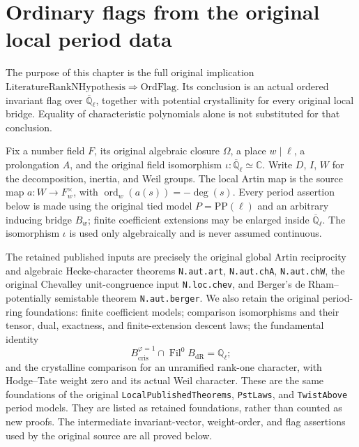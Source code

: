 \documentclass[11pt,a4paper]{article}
\numberwithin{equation}{section}
\theoremstyle{remark}\newtheorem{remark}[theorem]{Remark}
\begin{document}
\section{Ordinary flags from the original local period data}
\label{sec:ordinary-flags-v44}

The purpose of this chapter is the full original implication
\(\mathrm{LiteratureRankNHypothesis}\Rightarrow\mathrm{OrdFlag}\).
Its conclusion is an actual ordered invariant flag over
\(\overline{\mathbb Q}_\ell\), together with potential crystallinity
for every original local bridge.  Equality of characteristic
polynomials alone is not substituted for that conclusion.

Fix a number field \(F\), its original algebraic closure \(\Omega\),
a place \(w\mid\ell\), a prolongation \(A\), and the original
field isomorphism \(\iota:\overline{\mathbb Q}_\ell\simeq\mathbb C\).
Write \(D\), \(I\), \(W\) for the decomposition, inertia, and Weil
groups.  The local Artin map is the source map
\(a:W\to F_w^\times\), with
\(\operatorname{ord}_w(a(s))=-\deg(s)\).
Every period assertion below is made using the original tied model
\(P=\mathrm{PP}(\ell)\) and an arbitrary inducing bridge
\(B_w\); finite coefficient extensions may be enlarged inside
\(\overline{\mathbb Q}_\ell\).  The isomorphism \(\iota\) is used
only algebraically and is never assumed continuous.

The retained published inputs are precisely the original global Artin
reciprocity and algebraic Hecke-character theorems
\texttt{N.\allowbreak aut.\allowbreak art}, \texttt{N.\allowbreak aut.\allowbreak ch\allowbreak A}, \texttt{N.\allowbreak aut.\allowbreak ch\allowbreak W}, the
original Chevalley unit-congruence input \texttt{N.\allowbreak loc.\allowbreak chev}, and
Berger's de Rham--potentially semistable theorem
\texttt{N.\allowbreak aut.\allowbreak berger}.  We also retain the original period-ring
foundations: finite coefficient models; comparison isomorphisms and
their tensor, dual, exactness, and finite-extension descent laws;
the fundamental identity
\[
 B_{\mathrm{cris}}^{\varphi=1}\cap
             \operatorname{Fil}^0B_{\mathrm{dR}}=\mathbb Q_\ell;
 \tag{OFL.1}
\]
and the crystalline comparison for an unramified rank-one character,
with Hodge--Tate weight zero and its actual Weil character.
These are the same foundations of the original \texttt{Local\allowbreak Published\allowbreak Theorems},
\texttt{Pst\allowbreak Laws}, and \texttt{Twist\allowbreak Above} period models.  They are
listed as retained foundations, rather than counted as new proofs.
The intermediate invariant-vector, weight-order, and flag assertions
used by the original source are all proved below.
\end{document}
